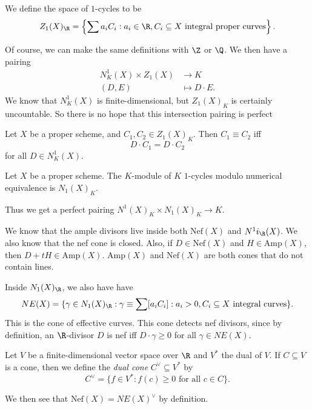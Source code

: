\documentclass[a4paper]{article}
\newcommand\Amp{\mathrm{Amp}}
\newcommand\Nef{\mathrm{Nef}}
\begin{document}
\begin{defi}[1-cycles]
  We define the space of $1$-cycles to be
  \[
    Z_1(X)_\R = \left\{\sum a_i C_i : a_i \in \R, C_i \subseteq X\text{ integral proper curves}\right\}.
  \]
\end{defi}
Of course, we can make the same definitions with $\Z$ or $\Q$. We then have a pairing
\begin{align*}
  N^1_K(X) \times Z_1(X) &\to K\\
  (D, E) &\mapsto D \cdot E.
\end{align*}
We know that $N^1_K(X)$ is finite-dimensional, but $Z_1(X)_K$ is certainly uncountable. So there is no hope that this intersection pairing is perfect
\begin{defi}\index{$\equiv$}
  Let $X$ be a proper scheme, and $C_1, C_2 \in Z_1(X)_K$. Then $C_1 \equiv C_2$ iff
  \[
    D \cdot C_1 = D \cdot C_2
  \]
  for all $D \in N^1_K(X)$.
\end{defi}

\begin{defi}[$N_1(X)_K$]
  Let $X$ be a proper scheme. The $K$-module of $K$ $1$-cycles modulo numerical equivalence is $N_1(X)_K$.
\end{defi}
Thus we get a perfect pairing $N^1(X)_K \times N_1(X)_K \to K$.

We know that the ample divisors live inside both $\Nef(X)$ and $N^1i_\R(X)$. We also know that the nef cone is closed. Also, if $D \in \Nef(X)$ and $H \in \Amp(X)$, then $D + tH \in \Amp(X)$. $\Amp(X)$ and $\Nef(X)$ are both cones that do not contain lines. %

Inside $N_1(X)_\R$, we also have have
\[
  NE(X) = \{\gamma \in N_1(X)_\R : \gamma \equiv \sum [a_i C_i]: a_i > 0, C_i \subseteq X\text{ integral curves}\}.
\]
This is the cone of effective curves. This cone detects nef divisors, since by definition, an $\R$-divisor $D$ is nef iff $D \cdot \gamma \geq 0$ for all $\gamma \in NE(X)$.

\begin{defi}
  Let $V$ be a finite-dimensional vector space over $\R$ and $V^*$ the dual of $V$. If $C \subseteq V$ is a cone, then we define the \emph{dual cone} $C^\vee \subseteq V^*$  by
  \[
    C^\vee = \{f \in V^* : f(c) \geq 0\text{ for all }c \in C\}.
  \]
\end{defi}
We then see that $\Nef(X) = NE(X)^\vee$ by definition.
\end{document}
